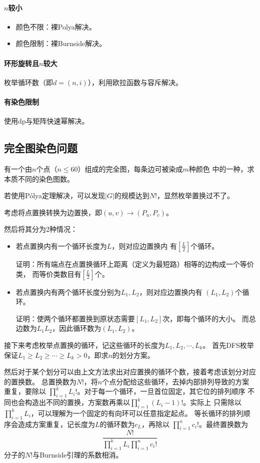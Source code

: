 \paragraph{$n$较小}
\begin{itemize}
	\item 颜色不限：裸Polya解决。
	\item 颜色限制：裸Burnside解决。
\end{itemize}
\paragraph{环形旋转且$n$较大}
枚举循环数（即$d=(n,i)$），利用欧拉函数与容斥解决。
\paragraph{有染色限制}
使用dp与矩阵快速幂解决。

\subsection{完全图染色问题}
有一个由$n$个点（$n\leq 60$）组成的完全图，每条边可被染成$m$种颜色
中的一种，求本质不同的染色图数。

若使用Pólya定理解决，可以发现$|G|$的规模达到$N!$，显然枚举置换过不了。

考虑将点置换转换为边置换，即$(u,v)\rightarrow (P_u,P_v)$。

然后将其分为2种情况：
\begin{itemize}
	\item 若点置换内有一个循环长度为$L$，则对应边置换内
	有$\left[\frac{L}{2}\right]$个循环。

	证明：所有端点在点置换循环上距离（定义为最短路）相等的边构成一个等价类，
	而等价类数目有$\left[\frac{L}{2}\right]$个。

	\item 若点置换内有两个循环长度分别为$L_1,L_2$，则对应边置换内有
	$(L_1,L_2)$个循环。

	证明：使两个循环都置换到原状态需要$[L_1,L_2]$次，即每个循环的大小。
	而总边数为$L_1L_2$，因此循环数为$(L_1,L_2)$。
\end{itemize}

接下来考虑枚举点置换的循环，记这些循环的长度为$L_1,L_2,\cdots,L_k$。
首先DFS枚举保证$L_1\geq L_2 \geq \cdots \geq L_k>0$，即求$n$的划分方案。

然后对于某个划分可以由上文方法求出对应置换的循环个数，接着考虑该划分对应的置换数。
总置换数为$N!$，将$n$个点分配给这些循环，去掉内部排列导致的方案重复，要除以
$\displaystyle \prod_{i=1}^k{L_i!}$。对于每一个循环，一旦首位固定，其它位的排列顺序
不同也会构造出不同的置换，方案数再乘以$\displaystyle \prod_{i=1}^k{(L_i-1)!}$。实际上
只需除以$\displaystyle \prod_{i=1}^k{L_i}$，可以理解为一个固定的有向环可以任意指定起点。
等长循环的排列顺序会造成方案重复，记长度为$L$的循环数为$c_L$，再除以
$\displaystyle \prod_{i=1}^n{c_i!}$。最终置换数为
\begin{displaymath}
	\frac{N!}{\prod_{i=1}^k{L_i}\prod_{i=1}^n{c_i!}}
\end{displaymath}
分子的$N!$与Burnside引理的系数相消。

